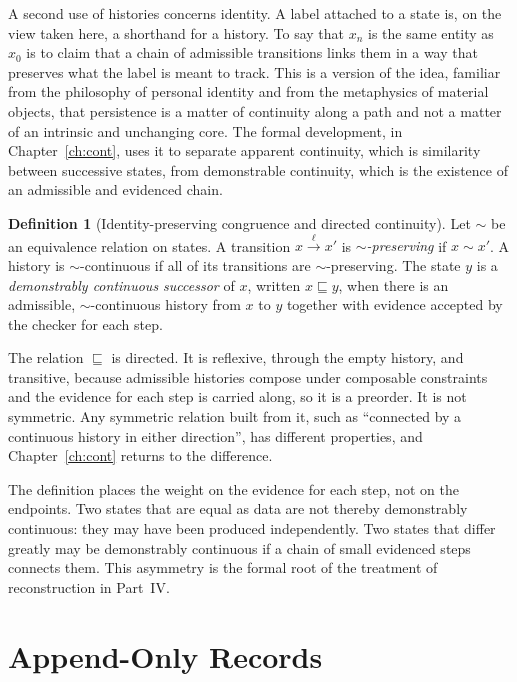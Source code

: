 \documentclass[11pt,twoside,openright]{book}
\theoremstyle{plain}
\theoremstyle{definition}
\newtheorem{definition}[theorem]{Definition}
\theoremstyle{remark}
\begin{document}
A second use of histories concerns identity. A label attached to a state is, on the view taken here, a shorthand for a history. To say that $x_n$ is the same entity as $x_0$ is to claim that a chain of admissible transitions links them in a way that preserves what the label is meant to track. This is a version of the idea, familiar from the philosophy of personal identity and from the metaphysics of material objects, that persistence is a matter of continuity along a path and not a matter of an intrinsic and unchanging core. The formal development, in Chapter~\ref{ch:cont}, uses it to separate apparent continuity, which is similarity between successive states, from demonstrable continuity, which is the existence of an admissible and evidenced chain.

\begin{definition}[Identity-preserving congruence and directed continuity]
Let $\sim$ be an equivalence relation on states. A transition $x\xrightarrow{\ell}x'$ is \emph{$\sim$-preserving} if $x\sim x'$. A history is $\sim$-continuous if all of its transitions are $\sim$-preserving. The state $y$ is a \emph{demonstrably continuous successor} of $x$, written $x\sqsubseteq y$, when there is an admissible, $\sim$-continuous history from $x$ to $y$ together with evidence accepted by the checker for each step.
\end{definition}

The relation $\sqsubseteq$ is directed. It is reflexive, through the empty history, and transitive, because admissible histories compose under composable constraints and the evidence for each step is carried along, so it is a preorder. It is not symmetric. Any symmetric relation built from it, such as ``connected by a continuous history in either direction'', has different properties, and Chapter~\ref{ch:cont} returns to the difference.

The definition places the weight on the evidence for each step, not on the endpoints. Two states that are equal as data are not thereby demonstrably continuous: they may have been produced independently. Two states that differ greatly may be demonstrably continuous if a chain of small evidenced steps connects them. This asymmetry is the formal root of the treatment of reconstruction in Part~IV.

\section{Append-Only Records}
\end{document}
